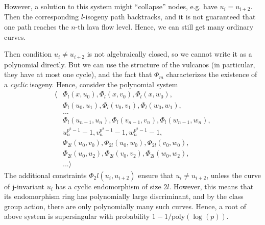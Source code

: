 However, a solution to this system might ``collapse'' nodes, e.g. have $u_i = u_{i + 2}$.
Then the corresponding $l$-isogeny path backtracks, and it is not guaranteed that one path reaches the $n$-th lava flow level.
Hence, we can still get many ordinary curves.

Then condition $u_i \neq u_{i + 2}$ is not algebraically closed, so we cannot write it as a polynomial directly.
But we can use the structure of the vulcanos (in particular, they have at most one cycle), and the fact that $\Phi_m$ characterizes the existence of a \emph{cyclic} isogeny.
Hence, consider the polynomial system
\begin{align*}
    \langle &\Phi_l(x, u_0), \Phi_l(x, v_0), \Phi_l(x, w_0), \\
    &\Phi_l(u_0, u_1), \Phi_l(v_0, v_1), \Phi_l(w_0, w_1), \\
    &... \\
    &\Phi_l(u_{n - 1}, u_n), \Phi_l(v_{n - 1}, v_n), \Phi_l(w_{n - 1}, w_n), \\
    &u_n^{p^2 - 1} - 1, v_n^{p^2 - 1} - 1, w_n^{p^2 - 1} - 1, \\
    &\Phi_{2l}(u_0, v_0), \Phi_{2l}(u_0, w_0), \Phi_{2l}(v_0, w_0), \\
    &\Phi_{2l}(u_0, u_2), \Phi_{2l}(v_0, v_2), \Phi_{2l}(w_0, w_2), \\
    &... \rangle
\end{align*}
The additional constraints $\Phi_2l(u_i, u_{i + 2})$ ensure that $u_i \neq u_{i + 2}$, unless the curve of j-invariant $u_i$ has a cyclic endomorphism of size $2l$.
However, this means that its endomorphism ring has polynomially large discriminant, and by the class group action, there are only polynomially many such curves.
Hence, a root of above system is supersingular with probability $1 - 1/\mathrm{poly}(\log(p))$. 


